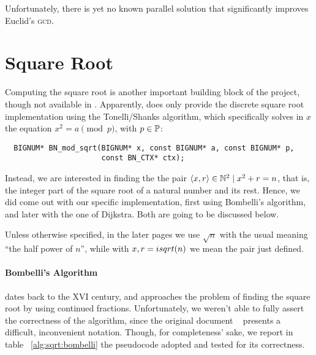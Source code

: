 Unfortunately, there is yet no known parallel solution that significantly improves
Euclid's \textsc{gcd}.


\section{Square Root \label{sec:preq:sqrt}}

Computing the square root is another important building block of the project,
though not available in \openssl\!.
Apparently,
\openssl does only provide the discrete square root implementation using the
Tonelli/Shanks algorithm, which specifically solves in $x$ the equation
$x^2 = a \pmod{p}$, with $p \in \mathbb{P}$:

\begin{verbatim}
  BIGNUM* BN_mod_sqrt(BIGNUM* x, const BIGNUM* a, const BIGNUM* p,
                      const BN_CTX* ctx);
\end{verbatim}

Instead, we are interested in finding the the pair
$\langle x, r\rangle \in \mathbb{N}^2 \mid x^2 + r = n$, that is, the integer part of
the square root of a natural number and its rest.
Hence, we did come out with our specific implementation, first using Bombelli's
algorithm, and later with the one of Dijkstra. Both are going to be discussed
below.

Unless otherwise specified, in the later pages we use $\sqrt{n}$ with the
usual meaning ``the half power of $n$'', while with $x, r = isqrt(n)$ we mean
the pair just defined.

\paragraph{Bombelli's Algorithm \label{par:preq:sqrt:bombelli}} dates back to
the XVI century, and approaches the problem of finding the square root by using
continued fractions. Unfortunately, we weren't able to fully assert the
correctness of the algorithm, since the original document
~\cite{bombelli:algebra} presents a difficult, inconvenient notation. Though,
for completeness' sake, we report in table
~\ref{alg:sqrt:bombelli} the pseudocode adopted and tested for its correctness.

